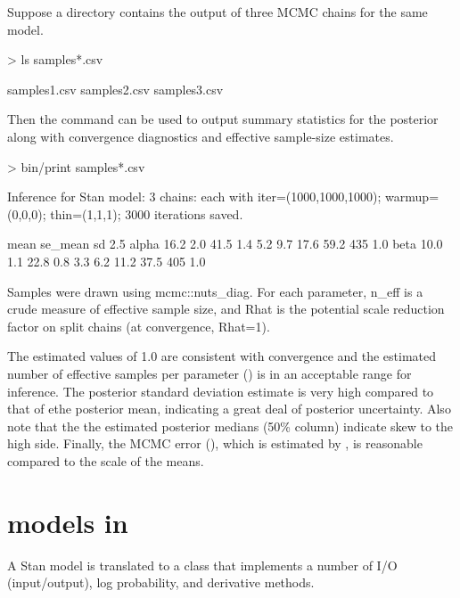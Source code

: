 \documentclass[article]{jss}
\begin{document}
Suppose a directory contains the output of three MCMC chains for the
same model.
%
\begin{CodeChunk}
\begin{CodeInput}
> ls samples*.csv
\end{CodeInput}
\begin{CodeOutput}
samples1.csv	samples2.csv	samples3.csv
\end{CodeOutput}
\end{CodeChunk}
%
Then the  command can be used to output summary
statistics for the posterior along with convergence diagnostics and
effective sample-size estimates.
%
\begin{CodeChunk}
\begin{CodeInput}
> bin/print samples*.csv
\end{CodeInput}
\begin{CodeOutput}
Inference for Stan model: 
3 chains: each with iter=(1000,1000,1000); warmup=(0,0,0); 
thin=(1,1,1); 3000 iterations saved.

       mean se_mean   sd 2.5%
alpha  16.2     2.0 41.5  1.4  5.2  9.7 17.6  59.2   435  1.0
beta   10.0     1.1 22.8  0.8  3.3  6.2 11.2  37.5   405  1.0

Samples were drawn using mcmc::nuts_diag.
For each parameter, n_eff is a crude measure of effective 
sample size, and Rhat is the potential scale reduction factor 
on split chains (at convergence, Rhat=1).
\end{CodeOutput}
\end{CodeChunk}
%
The estimated  values of 1.0 are consistent with
convergence and the estimated number of effective samples per
parameter () is in an acceptable range for inference.
The posterior standard deviation estimate is very high compared to
that of ethe posterior mean, indicating a great deal of posterior
uncertainty.  Also note that the the estimated posterior medians (50\%
column) indicate skew to the high side.  Finally, the MCMC error
(), which is estimated by , 
is reasonable compared to the scale of the means.

\section[Stan models in C++]{ models in }

A Stan model is translated to a  class that implements a
number of I/O (input/output), log probability, and derivative methods.
\end{document}
